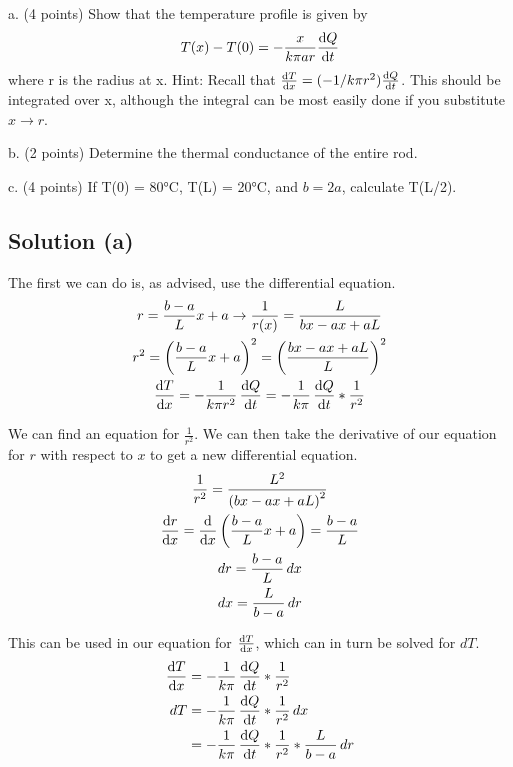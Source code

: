 \documentclass[12pt]{article}
\begin{document}
        a. (4 points) Show that the temperature profile is given by
        \begin{equation*}
            T (x) - T (0) = - \frac{x}{k \pi ar}\dv{Q}{t}
        \end{equation*}
        where r is the radius at x. 
        Hint: Recall that $\dv{T}{x} = (-1/k \pi r^2)\dv{Q}{t}$. 
        This should be integrated over x, although the integral can be most easily done if you substitute $x \to r$.
        
        b. (2 points) Determine the thermal conductance of the entire rod.
        
        c. (4 points) If T(0) = 80\unit{\celsius}, T(L) = 20\unit{\celsius}, and $b = 2a$, calculate T(L/2).


        \subsection{Solution (a)}
            The first we can do is, as advised, use the differential equation. 
            \begin{gather}
                r   =   \frac{b - a}{L} x + a \to \frac{1}{r(x)} = \frac{L}{bx - ax + aL}\\
                r^2 =   \left( \frac{b - a}{L} x + a \right)^2
                    =   \left( \frac{bx - ax + aL}{L} \right)^2\\
                \dv{T}{x}   = -\frac{1}{k \pi r^2}\,\dv{Q}{t}
                    =   -\frac{1}{k \pi}\,\dv{Q}{t} * \frac{1}{r^2}
            \end{gather}

            We can find an equation for $\frac{1}{r^2}$.
            We can then take the derivative of our equation for $r$ with respect to $x$ to get a new differential equation.
            \begin{gather}
                \frac{1}{r^2}   =   \frac{L^2}{\left( bx - ax + aL \right)^2}\\
                \dv{r}{x}   =   \dv{x}\left( \frac{b - a}{L} x + a \right)
                    =   \frac{b - a}{L}\\
                dr  =   \frac{b - a}{L}\,dx\\
                dx  =   \frac{L}{b - a}\,dr
            \end{gather}

            This can be used in our equation for $\dv{T}{x}$, which can in turn be solved for $dT$.
            \begin{align}
                \dv{T}{x}   &=  -\frac{1}{k \pi}\,\dv{Q}{t} * \frac{1}{r^2}\\
                dT  &=  -\frac{1}{k \pi}\,\dv{Q}{t} * \frac{1}{r^2}\,dx\\
                    &=  -\frac{1}{k \pi}\,\dv{Q}{t} * \frac{1}{r^2} * \frac{L}{b - a}\,dr
            \end{align}
\end{document}
